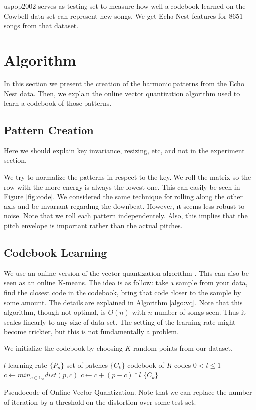 \documentclass{article}
\begin{document}
uspop2002 serves as testing set to measure how well a codebook learned on
the Cowbell data set can represent new songs. We get Echo Nest features
for $8651$ songs from that dataset.

\section{Algorithm}\label{sec:algo}
In this section we present the creation of the harmonic patterns from
the Echo Nest data. Then, we explain the online vector quantization algorithm
used to learn a codebook of those patterns.

\subsection{Pattern Creation}
Here we should explain key invariance, resizing, etc, and not in the
experiment section.

We try to normalize the patterns in respect to the key. We roll the matrix
so the row with the more energy is always the lowest one. This can easily be
seen in Figure \ref{fig:code}. We considered the same technique for rolling
along the other axis and be invariant regarding the downbeat. However, it
seems less robust to noise. Note that we roll each pattern independentely.
Also, this implies that the pitch envelope is important rather than the actual 
pitches.



\subsection{Codebook Learning}
We use an online version of the vector quantization algorithm 
\cite{Gersho1991}. This can also be seen as an online K-means.
The idea is as follow: take a sample from your data, find the closest
code in the codebook, bring that code closer to the sample by some amount.
The details are explained in Algorithm \ref{algo:vq}. Note that this
algorithm, though not optimal, is $O(n)$ with $n$ number of songs seen.
Thus it scales linearly to any size of data set. The setting of the learning
rate might become trickier, but this is not fundamentally a problem.


We initialize the codebook by choosing $K$ random points from our dataset.


\begin{algorithm}
\begin{algorithmic}
\STATE$l$ learning rate
\STATE$\{P_n\}$ set of patches
\STATE$\{C_k\}$ codebook of $K$ codes
\REQUIRE $0 < l \leq 1$
\STATE$c \leftarrow min_{c \in C_k} dist(p,c)$
\STATE$c \leftarrow c + (p - c) * l$
\ENDFOR
\ENDFOR
\RETURN $\{C_k\}$
\caption{{Pseudocode of Online Vector Quantization. Note that we can replace
the number of iteration by a threshold on the distortion over some test set.}
\label{algo:vq}}
\end{algorithmic}
\end{algorithm}
\end{document}
